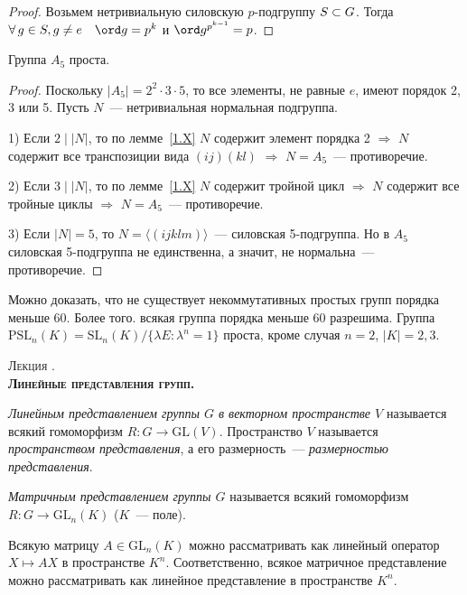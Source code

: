 \documentclass[a4paper]{article}
\newcounter{lec}
\renewcommand{\thelec}{\Roman{lec}}
\newcommand*{\lecture}[1]{\refstepcounter{lec}\vspace{20pt}
\begin{center}{\rmfamily\textsc{Лекция \thelec. \\ \textbf{#1}}}\vspace{5pt}
\end{center}}
\newcommand*{\p}[1]{#1\nobreak\discretionary{}{\hbox{$\mathsurround=0pt #1$}}{}}
\begin{document}
\begin{proof}
Возьмем нетривиальную силовскую $p$-подгруппу $S\p\subset G$. Тогда
$\forall \, g\in S, g\neq e\quad \ord g=p^k$ и $\ord g^{p^{k-1}}=p$.
\end{proof}

\begin{theorem}
Группа $A_5$ проста.
\end{theorem}

\begin{proof}
Поскольку $|A_5|=2^2\cdot 3\cdot 5$, то все элементы, не равные $e$,
имеют порядок 2, 3 или 5. Пусть $N$~--- нетривиальная нормальная
подгруппа.

1) Если $2\mid|N|$, то по лемме~\ref{1.X} $N$ содержит элемент
порядка 2 $\Rightarrow$ $N$ содержит все транспозиции вида
$(ij)(kl)$ $\Rightarrow$ $N=A_5$~--- противоречие.

2) Если $3\mid|N|$, то по лемме~\ref{1.X} $N$ содержит тройной цикл
$\Rightarrow$ $N$ содержит все тройные циклы $\Rightarrow$
$N=A_5$~--- противоречие.

3) Если $|N|=5$, то $N=\langle(ijklm)\rangle$~--- силовская
5-подгруппа. Но в $A_5$ силовская 5-подгруппа не единственна, а
значит, не нормальна~--- противоречие.
\end{proof}

\begin{note}
Можно доказать, что не существует некоммутативных простых групп
порядка меньше 60. Более того. всякая группа порядка меньше 60
разрешима. Группа
$\mathrm{P\mathrm{SL}}_n(K)=\mathrm{SL}_n(K)/\{\lambda E:
\lambda^n=1\}$ проста, кроме случая $n=2$, $|K|=2,3$.
\end{note}
\lecture{Линейные представления групп.}

\emph{Линейным представлением группы $G$ в векторном пространстве
$V$} называется всякий гомоморфизм $R\colon G\to \mathrm{GL}(V)$.
Пространство $V$ называется \emph{пространством представления}, а
его размерность~--- \emph{размерностью представления}.

\emph{Матричным представлением группы $G$} называется всякий
гомоморфизм $R\colon G\to \mathrm{GL}_n(K)$ ($K$~--- поле).

Всякую матрицу $A\in \mathrm{GL}_n(K)$ можно рассматривать как
линейный оператор $X\mapsto AX$ в пространстве $K^n$.
Соответственно, всякое матричное представление можно рассматривать
как линейное представление в пространстве $K^n$.
\end{document}
